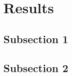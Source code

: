 
\section{Results}
\label{sec:results}


\subsection{Subsection 1}
\label{subsec:results_1}


\subsection{Subsection 2}
\label{subsec:results_2}